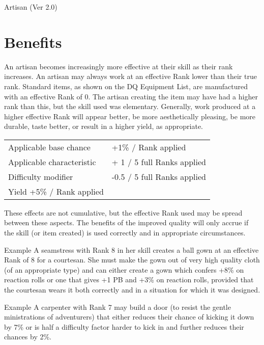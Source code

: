 \begin{Chapter}{Artisan (Ver 2.0)}
\begin{Description}
\end{Description}

\section{Benefits}

An artisan becomes increasingly more effective at their skill as their
rank increases.  An artisan may always work at an effective Rank lower
than their true rank.  Standard items, as shown on the DQ Equipment
List, are manufactured with an effective Rank of 0. The artisan
creating the item may have had a higher rank than this, but the skill
used was elementary.  Generally, work produced at a higher effective
Rank will appear better, be more aesthetically pleasing, be more
durable, taste better, or result in a higher yield, as appropriate.

\begin{tabularx}{\columnwidth}{XX}
Applicable base chance		& +1\% / Rank applied \\
Applicable characteristic	& + 1 / 5 full Ranks applied \\
Difficulty modifier		& -0.5 / 5 full Ranks applied \\
Yield				+5\% / Rank applied \\
\end{tabularx}

These effects are not cumulative, but the effective Rank used may be
spread between these aspects.  The benefits of the improved quality
will only accrue if the skill (or item created) is used correctly and
in appropriate circumstances.

\begin{Description}

\item[Example] A seamstress with Rank 8 in her skill creates a ball
  gown at an effective Rank of 8 for a courtesan.  She must make the
  gown out of very high quality cloth (of an appropriate type) and can
  either create a gown which confers +8\% on reaction rolls or one
  that gives +1 PB and +3\% on reaction rolls, provided that the
  courtesan wears it both correctly and in a situation for which it
  was designed.

\item[Example] A carpenter with Rank 7 may build a door (to resist the
  gentle ministrations of adventurers) that either reduces their
  chance of kicking it down by 7\% or is half a difficulty factor
  harder to kick in and further reduces their chances by 2\%.


\end{Description}
\end{Chapter}
